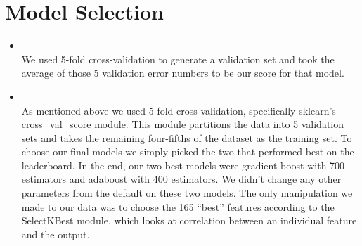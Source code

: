 \section{Model Selection}
\medskip
\begin{itemize}

    \item {} \\
    We used 5-fold cross-validation to generate a validation set and took the
    average of those 5 validation error numbers to be our score for that model. 

    \item {} \\
    As mentioned above we used 5-fold cross-validation, specifically sklearn's
    cross\_val\_score module. This module partitions the data into 5 validation
    sets and takes the remaining four-fifths of the dataset as the training set.
    To choose our final models we simply picked the two that performed best on the
    leaderboard. In the end, our two best models were gradient boost with 700 estimators
    and adaboost with 400 estimators. We didn't change any other parameters from the
    default on these two models. The only manipulation we made to our data was to
    choose the 165 ``best'' features according to the SelectKBest module, which
    looks at correlation between an individual feature and the output.  


\end{itemize}



